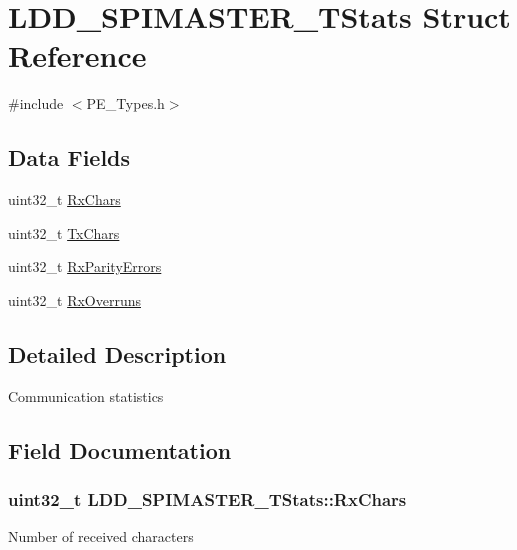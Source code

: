 \hypertarget{struct_l_d_d___s_p_i_m_a_s_t_e_r___t_stats}{}\section{L\+D\+D\+\_\+\+S\+P\+I\+M\+A\+S\+T\+E\+R\+\_\+\+T\+Stats Struct Reference}
\label{struct_l_d_d___s_p_i_m_a_s_t_e_r___t_stats}


{\ttfamily \#include $<$P\+E\+\_\+\+Types.\+h$>$}

\subsection*{Data Fields}
\begin{DoxyCompactItemize}
\item 
uint32\+\_\+t \hyperlink{struct_l_d_d___s_p_i_m_a_s_t_e_r___t_stats_a6faa4c57f364f06f5cd3770a7686ef6f}{Rx\+Chars}
\item 
uint32\+\_\+t \hyperlink{struct_l_d_d___s_p_i_m_a_s_t_e_r___t_stats_af5376883e99d71f857999d58b2888f95}{Tx\+Chars}
\item 
uint32\+\_\+t \hyperlink{struct_l_d_d___s_p_i_m_a_s_t_e_r___t_stats_a83f9f4b7598e6d84e6842539cc54619f}{Rx\+Parity\+Errors}
\item 
uint32\+\_\+t \hyperlink{struct_l_d_d___s_p_i_m_a_s_t_e_r___t_stats_a528cf1d78c49b42ae455ba895987ece5}{Rx\+Overruns}
\end{DoxyCompactItemize}


\subsection{Detailed Description}
Communication statistics 

\subsection{Field Documentation}
\subsubsection[{\texorpdfstring{Rx\+Chars}{RxChars}}]{\setlength{\rightskip}{0pt plus 5cm}uint32\+\_\+t L\+D\+D\+\_\+\+S\+P\+I\+M\+A\+S\+T\+E\+R\+\_\+\+T\+Stats\+::\+Rx\+Chars}\hypertarget{struct_l_d_d___s_p_i_m_a_s_t_e_r___t_stats_a6faa4c57f364f06f5cd3770a7686ef6f}{}\label{struct_l_d_d___s_p_i_m_a_s_t_e_r___t_stats_a6faa4c57f364f06f5cd3770a7686ef6f}
Number of received characters 
